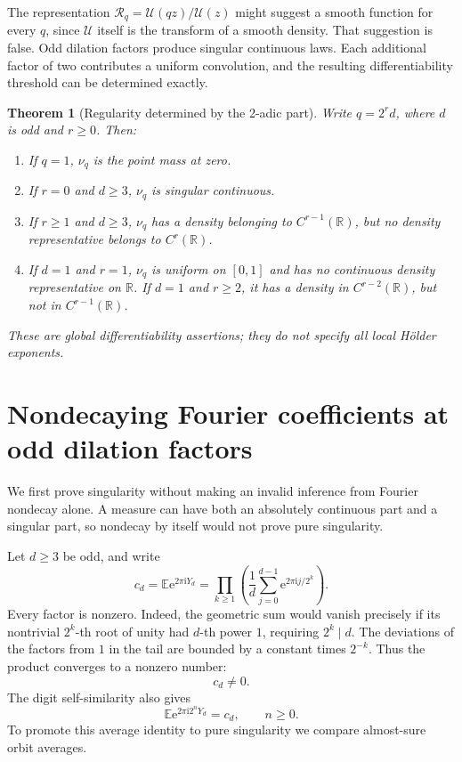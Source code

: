 \documentclass[11pt,a4paper,oneside,openany]{book}
\numberwithin{equation}{chapter}
\newtheorem{theorem}{Theorem}[chapter]
\theoremstyle{definition}
\theoremstyle{remark}
\newcommand{\R}{\mathbb R}
\newcommand{\E}{\mathbb E}
\newcommand{\e}{\mathrm e}
\newcommand{\ii}{\mathrm i}
\newcommand{\Up}{\mathcal U}
\newcommand{\Rp}{\mathcal R}
\begin{document}
The representation \(\Rp_q=\Up(qz)/\Up(z)\) might suggest a smooth function for every \(q\), since \(\Up\) itself is the transform of a smooth density. That suggestion is false. Odd dilation factors produce singular continuous laws. Each additional factor of two contributes a uniform convolution, and the resulting differentiability threshold can be determined exactly.

\begin{theorem}[Regularity determined by the 2-adic part]
\label{rr:thm:regularity}
Write \(q=2^rd\), where \(d\) is odd and \(r\geq0\). Then:
\begin{enumerate}[label=(\roman*)]
\item If \(q=1\), \(\nu_q\) is the point mass at zero.
\item If \(r=0\) and \(d\geq3\), \(\nu_q\) is singular continuous.
\item If \(r\geq1\) and \(d\geq3\), \(\nu_q\) has a density belonging to \(C^{r-1}(\R)\), but no density representative belongs to \(C^r(\R)\).
\item If \(d=1\) and \(r=1\), \(\nu_q\) is uniform on \([0,1]\) and has no continuous density representative on \(\R\). If \(d=1\) and \(r\geq2\), it has a density in \(C^{r-2}(\R)\), but not in \(C^{r-1}(\R)\).
\end{enumerate}
These are global differentiability assertions; they do not specify all local H\"older exponents.
\end{theorem}

\section{Nondecaying Fourier coefficients at odd dilation factors}
We first prove singularity without making an invalid inference from Fourier nondecay alone. A measure can have both an absolutely continuous part and a singular part, so nondecay by itself would not prove pure singularity.

Let \(d\geq3\) be odd, and write
\[
 c_d=\E\e^{2\pi\ii Y_d}
 =\prod_{k\geq1}\left(\frac1d\sum_{j=0}^{d-1}
                                \e^{2\pi\ii j/2^k}\right).
\]
Every factor is nonzero. Indeed, the geometric sum would vanish precisely if its nontrivial \(2^k\)-th root of unity had \(d\)-th power \(1\), requiring \(2^k\mid d\). The deviations of the factors from \(1\) in the tail are bounded by a constant times \(2^{-k}\). Thus the product converges to a nonzero number:
\begin{equation}
 c_d\ne0.
 \label{rr:eq:cdnonzero}
\end{equation}
The digit self-similarity also gives
\begin{equation}
 \E\e^{2\pi\ii 2^nY_d}=c_d,\qquad n\geq0.
\end{equation}
To promote this average identity to pure singularity we compare almost-sure orbit averages.
\end{document}
